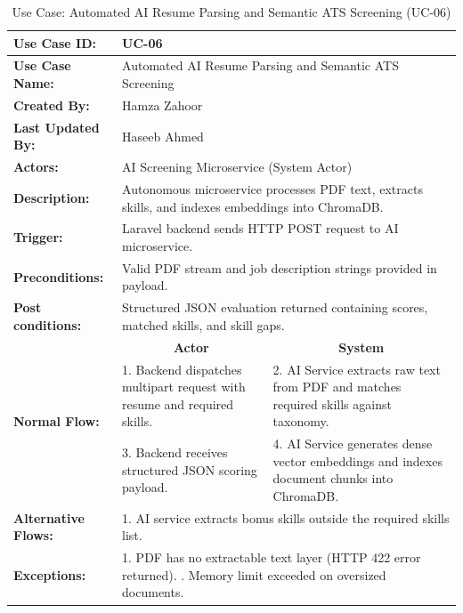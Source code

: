 \begin{table}[H]
\centering
\small
\caption{Use Case: Automated AI Resume Parsing and Semantic ATS Screening (UC-06)}
\label{tab:uc06_spec}
\begin{tabular}{|p{3.2cm}|p{5.5cm}|p{5.5cm}|}
\hline
\textbf{Use Case ID:} & \multicolumn{2}{p{11.4cm}|}{UC-06} \\ \hline
\textbf{Use Case Name:} & \multicolumn{2}{p{11.4cm}|}{Automated AI Resume Parsing and Semantic ATS Screening} \\ \hline
\textbf{Created By:} & \multicolumn{2}{p{11.4cm}|}{Hamza Zahoor} \\ \hline
\textbf{Last Updated By:} & \multicolumn{2}{p{11.4cm}|}{Haseeb Ahmed} \\ \hline
\textbf{Actors:} & \multicolumn{2}{p{11.4cm}|}{AI Screening Microservice (System Actor)} \\ \hline
\textbf{Description:} & \multicolumn{2}{p{11.4cm}|}{Autonomous microservice processes PDF text, extracts skills, and indexes embeddings into ChromaDB.} \\ \hline
\textbf{Trigger:} & \multicolumn{2}{p{11.4cm}|}{Laravel backend sends HTTP POST request to AI microservice.} \\ \hline
\textbf{Preconditions:} & \multicolumn{2}{p{11.4cm}|}{Valid PDF stream and job description strings provided in payload.} \\ \hline
\textbf{Post conditions:} & \multicolumn{2}{p{11.4cm}|}{Structured JSON evaluation returned containing scores, matched skills, and skill gaps.} \\ \hline
\multirow{3}{*}{\textbf{Normal Flow:}} & \multicolumn{1}{c|}{\textbf{Actor}} & \multicolumn{1}{c|}{\textbf{System}} \\ \cline{2-3}
& 1. Backend dispatches multipart request with resume and required skills. & 2. AI Service extracts raw text from PDF and matches required skills against taxonomy. \vspace{2pt} \\
& 3. Backend receives structured JSON scoring payload. & 4. AI Service generates dense vector embeddings and indexes document chunks into ChromaDB. \\ \hline
\textbf{Alternative Flows:} & \multicolumn{2}{p{11.4cm}|}{1. AI service extracts bonus skills outside the required skills list.} \\ \hline
\textbf{Exceptions:} & \multicolumn{2}{p{11.4cm}|}{1. PDF has no extractable text layer (HTTP 422 error returned). \newline 2. Memory limit exceeded on oversized documents.} \\ \hline
\end{tabular}
\end{table}

